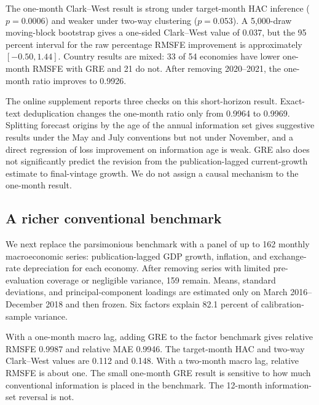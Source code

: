 \documentclass[preprint,12pt,authoryear]{elsarticle}
\begin{document}


The one-month Clark--West result is strong under target-month HAC inference ($p=0.0006$) and weaker under two-way clustering ($p=0.053$). A 5,000-draw moving-block bootstrap gives a one-sided Clark--West value of 0.037, but the 95 percent interval for the raw percentage RMSFE improvement is approximately $[-0.50,1.44]$. Country results are mixed: 33 of 54 economies have lower one-month RMSFE with GRE and 21 do not. After removing 2020--2021, the one-month ratio improves to 0.9926.

The online supplement reports three checks on this short-horizon result. Exact-text deduplication changes the one-month ratio only from 0.9964 to 0.9969. Splitting forecast origins by the age of the annual information set gives suggestive results under the May and July conventions but not under November, and a direct regression of loss improvement on information age is weak. GRE also does not significantly predict the revision from the publication-lagged current-growth estimate to final-vintage growth. We do not assign a causal mechanism to the one-month result.

\subsection{A richer conventional benchmark}

We next replace the parsimonious benchmark with a panel of up to 162 monthly macroeconomic series: publication-lagged GDP growth, inflation, and exchange-rate depreciation for each economy. After removing series with limited pre-evaluation coverage or negligible variance, 159 remain. Means, standard deviations, and principal-component loadings are estimated only on March 2016--December 2018 and then frozen. Six factors explain 82.1 percent of calibration-sample variance.



With a one-month macro lag, adding GRE to the factor benchmark gives relative RMSFE 0.9987 and relative MAE 0.9946. The target-month HAC and two-way Clark--West values are 0.112 and 0.148. With a two-month macro lag, relative RMSFE is about one. The small one-month GRE result is sensitive to how much conventional information is placed in the benchmark. The 12-month information-set reversal is not.
\end{document}
